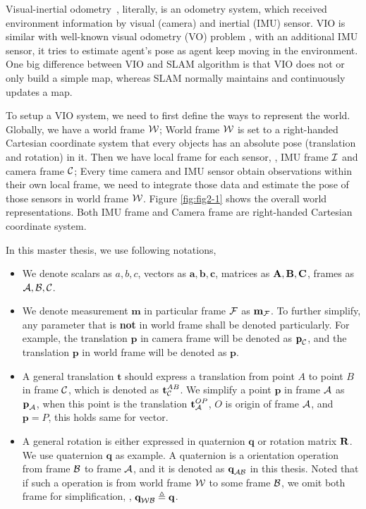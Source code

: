 Visual-inertial odometry~\cite{li2011consistency}, literally, is an odometry system, which received environment information by visual (camera) and inertial (IMU) sensor. VIO is similar with well-known visual odometry (VO) problem \cite{nister2004visual}, with an additional IMU sensor, it tries to estimate agent's pose as agent keep moving in the environment. One big difference between VIO and SLAM algorithm is that VIO does not or only build a simple map, whereas SLAM normally maintains and continuously updates a map.

To setup a VIO system, we need to first define the ways to represent the world. Globally, we have a world frame $\mathcal{W}$; World frame $\mathcal{W}$ is set to a right-handed Cartesian coordinate system that every objects has an absolute pose (translation and rotation) in it. Then we have local frame for each sensor, \ie, IMU frame $\mathcal{I}$ and camera frame $\mathcal{C}$; Every time camera and IMU sensor obtain observations within their own local frame, we need to integrate those data and estimate the pose of those sensors in world frame $\mathcal{W}$. Figure \ref{fig:fig2-1} shows the overall world representations. Both IMU frame and Camera frame are right-handed Cartesian coordinate system.

In this master thesis, we use following notations,
\begin{itemize}
\item {We denote scalars as $a, b, c$, vectors as $\textbf{a}, \textbf{b}, \textbf{c}$, matrices as $\mathbf{A}, \mathbf{B}, \mathbf{C}$, frames as $\mathcal{A}, \mathcal{B}, \mathcal{C}$.}
\item {We denote measurement $\textbf{m}$ in particular frame $\mathcal{F}$ as $\textbf{m}_{\mathcal{F}}$. To further simplify, any parameter that is \textbf{not} in world frame shall 
be denoted particularly. For example, the translation $\textbf{p}$ in camera frame will be denoted as $\textbf{p}_{\mathcal{C}}$, and the translation $\textbf{p}$ in world frame will be denoted as $\textbf{p}$. }
\item {A general translation $\textbf{t}$ should express a translation from point $A$ to point $B$ in frame $\mathcal{C}$, which is denoted as $\textbf{t}^{AB}_{\mathcal{C}}$. We simplify a point $\textbf{p}$ in frame $\mathcal{A}$ as $\textbf{p}_{\mathcal{A}}$, when this point is the translation $\textbf{t}^{OP}_{\mathcal{A}}$, $O$ is origin of frame $\mathcal{A}$, and $\textbf{p} = P$, this holds same for vector.}
\item {A general rotation is either expressed in quaternion $\textbf{q}$ or rotation matrix $\mathbf{R}$. We use quaternion $\textbf{q}$ as example. A quaternion is a  orientation operation from frame $\mathcal{B}$ to frame $\mathcal{A}$, and it is denoted as $\textbf{q}_{\mathcal{A}\mathcal{B}}$  in this thesis. Noted that if such a operation is from world frame $\mathcal{W}$ to some frame $\mathcal{B}$, we omit both frame for simplification, \ie, $\textbf{q}_{\mathcal{W}\mathcal{B}} \triangleq \textbf{q}$.}
\end{itemize}

